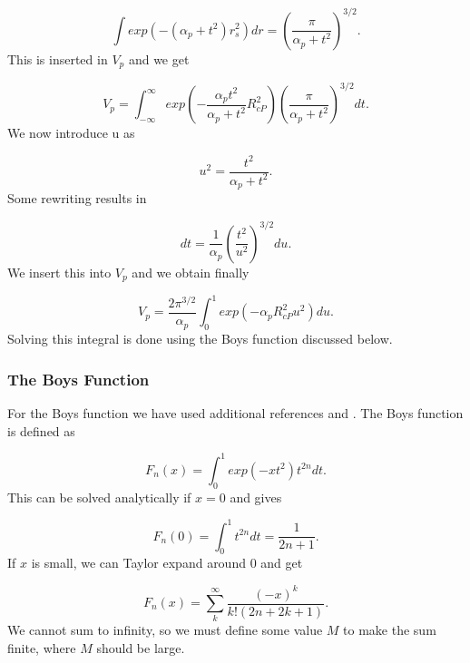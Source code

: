 \documentclass[a4paper,norsk,11pt,twoside]{report}
\begin{document}
\begin{equation}
\int 
exp \left(
- (\alpha_p + t^2) r_s^2
\right) dr
= \left(
\frac{\pi}{\alpha_p + t^2}
\right)^{3/2} .
\end{equation}
This is inserted in $V_p$ and we get

\begin{equation}
V_p = \int_{-\infty}^{\infty} exp \left( - \frac{\alpha_p t^2}{\alpha_p + t^2} R_{cP}^2 \right) \left(
\frac{\pi}{\alpha_p + t^2}
\right)^{3/2} dt .
\end{equation}
We now introduce u as

\begin{equation}
u^2 = \frac{t^2}{\alpha_p + t^2} .
\end{equation}
Some rewriting results in

\begin{equation}
dt = \frac{1}{\alpha_p} \left( 
\frac{t^2}{u^2}
\right)^{3/2} du  .
\end{equation}
We insert this into $V_p$ and we obtain finally

\begin{equation}
V_p = \frac{2 \pi^{3/2}}{\alpha_p}
\int_0^1 exp(- \alpha_p R_{cP}^2 u^2) du . \label{insert_boys}
\end{equation}
Solving this integral is done using the Boys function discussed below. 

\subsubsection{The Boys Function}
For the Boys function we have used additional references \cite{boys_referanse_1} and \cite{boys_referanse_2}. The Boys function is defined as 

\begin{equation}
F_n(x) = \int_0^1 exp(-x t^2) t^{2n} dt .
\end{equation}
This can be solved analytically if $x = 0$ and gives 

\begin{equation}
F_n(0) = \int_0^1 t^{2n} dt = \frac{1}{2n+1} .
\end{equation}
If $x$ is small, we can Taylor expand around 0 and get

\begin{equation}
F_n(x) = \sum_k^{\infty} \frac{(-x)^k}{k! (2n + 2k + 1)} .
\label{boys_int_1}
\end{equation}
We cannot sum to infinity, so we must define some value $M$ to make the sum finite, where $M$ should be large. \\
\end{document}
